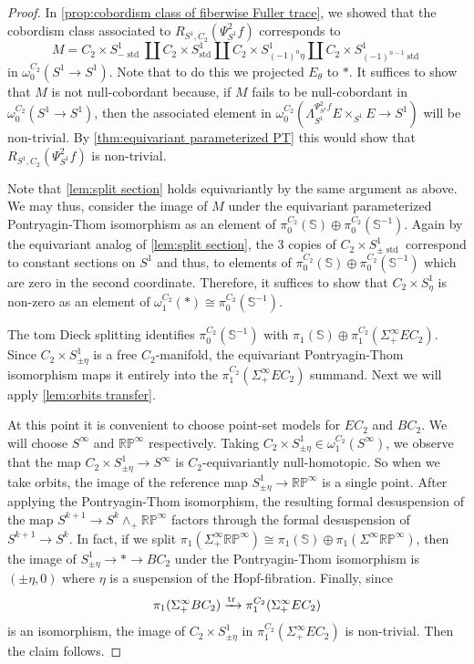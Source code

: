\documentclass[11pt]{amsart}
\newcommand{\Sph}{\mathbb{S}}
\newcommand{\RP}{\mathbb{RP}}
\newcommand{\tr}{\textup{tr}\,}
\DeclareMathOperator{\std}{std}
\theoremstyle{plain}   %
\theoremstyle{definition}
\theoremstyle{remark}
\numberwithin{equation}{section}
\begin{document}
\begin{proof}
In \cref{prop:cobordism class of fiberwise Fuller trace}, we showed that the cobordism class associated to $R_{S^1,C_2}(\Psi_{S^1}^{2}f)$ corresponds to 
\[
M=C_2\times S^1_{-\std}\amalg C_2\times S^1_{\std}\amalg C_2\times S^1_{(-1)^{n}\eta}\amalg C_2\times S^1_{(-1)^{n-1}\std}
\]
in $\omega_{0}^{C_2}(S^1\to S^1)$. Note that to do this we projected $E_\theta$ to $*$. It suffices to show that $M$ is not null-cobordant because, if $M$ fails to be null-cobordant in $\omega_0^{C_2}(S^1\to S^1)$, then the associated element in $\omega_0^{C_2}(\Lambda_{S^1}^{\Psi_{S^1}^{2}f}E\times_{S^1}E\to S^1)$ will be non-trivial. By \cref{thm:equivariant parameterized PT} this would show that $R_{S^1,C_2}(\Psi_{S^1}^{2}f)$ is non-trivial. 

Note that \cref{lem:split section} holds equivariantly by the same argument as above. We may thus, consider the image of $M$ under the equivariant parameterized Pontryagin-Thom isomorphism as an element of $\pi_0^{C_2}(\Sph)\oplus\pi_0^{C_2}(\Sph^{-1})$. Again by the equivariant analog of \cref{lem:split section}, the 3 copies of $C_2\times S^1_{\pm\std}$ correspond to constant sections on $S^1$ and thus, to elements of $\pi_0^{C_2}(\Sph)\oplus \pi_0^{C_2}(\Sph^{-1})$ which are zero in the second coordinate. Therefore, it suffices to show that $C_2\times S^1_\eta$ is non-zero as an element of $\omega_1^{C_2}(*)\cong\pi_0^{C_2}(\Sph^{-1})$.

The tom Dieck splitting identifies $\pi_0^{C_2}(\Sph^{-1})$ with $\pi_1(\Sph)\oplus\pi_1^{C_2}(\Sigma_+^\infty EC_2)$. Since $C_2\times S^1_{\pm\eta}$ is a free $C_2$-manifold, the equivariant Pontryagin-Thom isomorphism maps it entirely into the $\pi_1^{C_2}(\Sigma_+^\infty EC_2)$ summand. Next we will apply \cref{lem:orbits transfer}.

At this point it is convenient to choose point-set models for $EC_2$ and $BC_2$. We will choose $S^\infty$ and $\RP^\infty$ respectively. Taking $C_2\times S^1_{\pm\eta}\in\omega_1^{C_2}(S^\infty)$, we observe that the map $C_2\times S^1_{\pm\eta}\to S^\infty$ is $C_2$-equivariantly null-homotopic. So when we take orbits, the image of the reference map $S^1_{\pm\eta}\to \RP^\infty$ is a single point. After applying the Pontryagin-Thom isomorphism, the resulting formal desuspension of the map $S^{k+1}\to S^k\wedge_+ \RP^\infty$ factors through the formal desuspension of $S^{k+1}\to S^k$. In fact, if we split $\pi_1(\Sigma_+^\infty \RP^\infty)\cong \pi_1(\Sph)\oplus\pi_1(\Sigma^\infty \RP^\infty)$, then the image of $S^1_{\pm\eta}\to *\to BC_2$ under the Pontryagin-Thom isomorphism is $(\pm\eta,0)$ where $\eta$ is a suspension of the Hopf-fibration. Finally, since 
\[
\pi_1(\Sigma_+^\infty BC_2)\xrightarrow{\tr} \pi_1^{C_2}(\Sigma_+^\infty EC_2)
\]
is an isomorphism, the image of $C_2\times S^1_{\pm\eta}$ in $\pi_1^{C_2}(\Sigma_+^\infty EC_2)$ is non-trivial. Then the claim follows.  
\end{proof}
\end{document}
